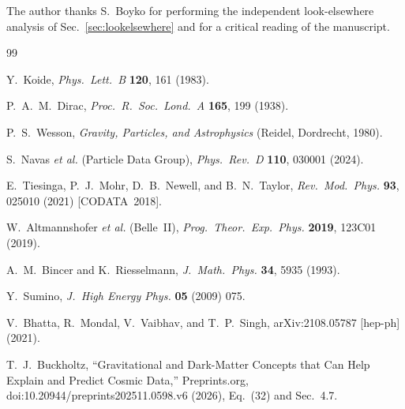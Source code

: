 \documentclass[aps,prd,twocolumn,amsmath,amssymb,floatfix,nofootinbib]{revtex4-2}
\begin{document}
\begin{acknowledgments}
The author thanks S.~Boyko for performing the independent look-elsewhere
analysis of Sec.~\ref{sec:lookelsewhere} and for a critical reading of the
manuscript.
\end{acknowledgments}

\begin{thebibliography}{99}

 Y.~Koide,
\textit{Phys.\ Lett.\ B} \textbf{120}, 161 (1983).

 P.~A.~M.~Dirac,
\textit{Proc.\ R.\ Soc.\ Lond.\ A} \textbf{165}, 199 (1938).

 P.~S.~Wesson,
\textit{Gravity, Particles, and Astrophysics} (Reidel, Dordrecht, 1980).

 S.~Navas \textit{et al.} (Particle Data Group),
\textit{Phys.\ Rev.\ D} \textbf{110}, 030001 (2024).

 E.~Tiesinga, P.~J.~Mohr, D.~B.~Newell, and B.~N.~Taylor,
\textit{Rev.\ Mod.\ Phys.} \textbf{93}, 025010 (2021) [CODATA~2018].

 W.~Altmannshofer \textit{et al.} (Belle~II),
\textit{Prog.\ Theor.\ Exp.\ Phys.} \textbf{2019}, 123C01 (2019).

 A.~M.~Bincer and K.~Riesselmann,
\textit{J.\ Math.\ Phys.} \textbf{34}, 5935 (1993).

 Y.~Sumino,
\textit{J.\ High Energy Phys.} \textbf{05} (2009) 075.

 V.~Bhatta, R.~Mondal, V.~Vaibhav, and T.~P.~Singh,
arXiv:2108.05787 [hep-ph] (2021).

 T.~J.~Buckholtz, ``Gravitational and Dark-Matter
Concepts that Can Help Explain and Predict Cosmic Data,'' Preprints.org,
doi:10.20944/preprints202511.0598.v6 (2026), Eq.~(32) and Sec.~4.7.

\end{thebibliography}
\end{document}
